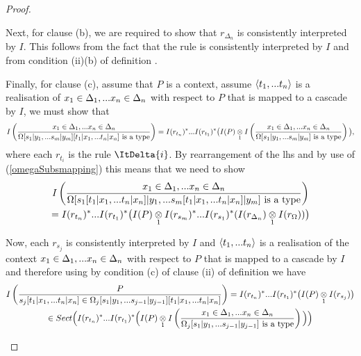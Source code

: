 \begin{proof}
\begin{enumerate}[(i)]
Next, for clause (b), we are required to show that $r_{\Delta_n}$ is consistently interpreted by $I$. 
This follows from the fact that 
the rule   is consistently interpreted by $I$ 
and from condition (ii)(b) of definition .

Finally, for clause (c), assume that $P$ is a context,
assume $\tuple{\tn}$ is a realisation of $\xDelta{n}$ with respect to $P$ that is mapped to a cascade by $I$, 
we must show that
$$\Imappedrule{\xDelta{n}}{\isT{\Omega[\SUBsFORy{m}][\SUBtFORx{n}]}}
                =I(r_{t_n})^* ... I(r_{t_1})^*\big(\crossx{I(P)}{\Imappedrule{\xDelta{n}}{\isT{\Omega[\SUBsFORy{m}]}}}{1}\big),$$
where each $r_{t_i}$ is the rule $\ItDelta{i}$.
By rearrangement of the lhs and by use of (\ref{omegaSubsmapping}) this means that we need to show 
\begin{multline}
\label{ctarget}
\Imappedrule{\xDelta{n}}{\isT{\Omega[s_1[\SUBtFORx{n}]|y_1,... s_m[\SUBtFORx{n}]|y_m]}} \\
                =I(r_{t_n})^* ... I(r_{t_1})^*\big(\crossx{I(P)}{I(r_{s_m})^*...I(r_{s_1})^*(\crossx{I(r_{\Delta_n})}{I(r_\Omega)}{1})}{1}\big)
\end{multline}

\newcommand{\IOmegaDoublySubstituted}[1]{\Omega_#1[\SUBsFORy{#1-1}][\SUBtFORx{n}]}
Now, each $r_{s_j}$ is consistently interpreted by $I$ and $\tuple{\tn}$ is a realisation
of the context $\xDelta{n}$ with respect to $P$ that is mapped to a cascade by $I$ and therefore using 
by condition (c) of clause (ii) of definition  we have 
\begin{multline*}
\Imappedrule{P}{\ofT{s_j[\SUBtFORx{n}]}{\IOmegaDoublySubstituted{j}}}
           = I(r_{t_n})^* ... I(r_{t_1})^*\big(\crossx{I(P)}{I(r_{s_j})} {1}\big) \\
           \in Sect\Big(I(r_{t_n})^* ... I(r_{t_1})^*\Big(\crossx{I(P)}{\Imappedrule{\xDelta{n}}{\isT{\Omega_j[\SUBsFORy{j-1}]}}} {1}\Big)\Big)
\end{multline*}


\end{enumerate}
\end{proof}
